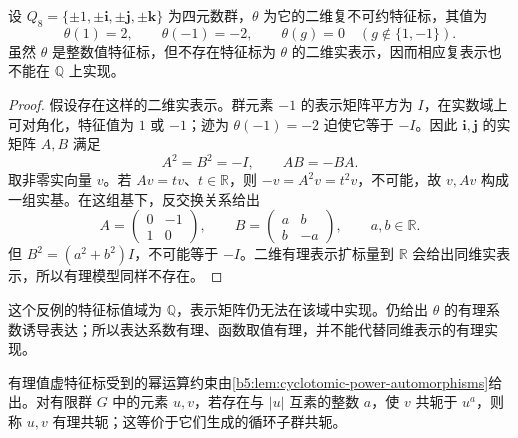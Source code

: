 \begin{proposition}\label{b5:prop:rational-values-no-real-model}
	设 \(Q_8=\{\pm1,\pm\mathbf i,\pm\mathbf j,\pm\mathbf k\}\) 为四元数群，\(\theta\) 为它的二维复不可约特征标，其值为
	\[
		\theta(1)=2,\qquad\theta(-1)=-2,\qquad \theta(g)=0\quad(g\notin\{1,-1\}).
	\]
	虽然 \(\theta\) 是整数值特征标，但不存在特征标为 \(\theta\) 的二维实表示，因而相应复表示也不能在 \(\mathbb Q\) 上实现。
\end{proposition}
\begin{proof}
	假设存在这样的二维实表示。群元素 \(-1\) 的表示矩阵平方为 \(I\)，在实数域上可对角化，特征值为 \(1\) 或 \(-1\)；迹为 \(\theta(-1)=-2\) 迫使它等于 \(-I\)。因此 \(\mathbf i,\mathbf j\) 的实矩阵 \(A,B\) 满足
	\[
		A^2=B^2=-I,\qquad AB=-BA.
	\]
	取非零实向量 \(v\)。若 \(Av=tv\)、\(t\in\mathbb R\)，则 \(-v=A^2v=t^2v\)，不可能，故 \(v,Av\) 构成一组实基。在这组基下，反交换关系给出
	\[
		A=\begin{pmatrix}0&-1\\1&0\end{pmatrix},\qquad
		B=\begin{pmatrix}a&b\\b&-a\end{pmatrix},\qquad a,b\in\mathbb R.
	\]
	但 \(B^2=(a^2+b^2)I\)，不可能等于 \(-I\)。二维有理表示扩标量到 \(\mathbb R\) 会给出同维实表示，所以有理模型同样不存在。
\end{proof}

这个反例的特征标值域为 \(\mathbb Q\)，表示矩阵仍无法在该域中实现。仍给出 \(\theta\) 的有理系数诱导表达；所以表达系数有理、函数取值有理，并不能代替同维表示的有理实现。

\ProseParagraphBreak
有理值虚特征标受到的幂运算约束由\cref{b5:lem:cyclotomic-power-automorphisms}给出。对有限群 \(G\) 中的元素 \(u,v\)，若存在与 \(|u|\) 互素的整数 \(a\)，使 \(v\) 共轭于 \(u^a\)，则称 \(u,v\) 有理共轭；这等价于它们生成的循环子群共轭。

